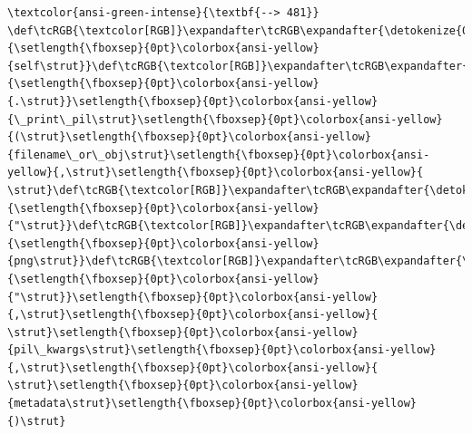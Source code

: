 \documentclass[11pt]{article}
\begin{document}
\begin{Verbatim}[commandchars=\\\{\}, frame=single, framerule=2mm, rulecolor=\color{outerrorbackground}]
\textcolor{ansi-green-intense}{\textbf{--> 481}}     \def\tcRGB{\textcolor[RGB]}\expandafter\tcRGB\expandafter{\detokenize{0,135,0}}{\setlength{\fboxsep}{0pt}\colorbox{ansi-yellow}{self\strut}}\def\tcRGB{\textcolor[RGB]}\expandafter\tcRGB\expandafter{\detokenize{98,98,98}}{\setlength{\fboxsep}{0pt}\colorbox{ansi-yellow}{.\strut}}\setlength{\fboxsep}{0pt}\colorbox{ansi-yellow}{\_print\_pil\strut}\setlength{\fboxsep}{0pt}\colorbox{ansi-yellow}{(\strut}\setlength{\fboxsep}{0pt}\colorbox{ansi-yellow}{filename\_or\_obj\strut}\setlength{\fboxsep}{0pt}\colorbox{ansi-yellow}{,\strut}\setlength{\fboxsep}{0pt}\colorbox{ansi-yellow}{ \strut}\def\tcRGB{\textcolor[RGB]}\expandafter\tcRGB\expandafter{\detokenize{175,0,0}}{\setlength{\fboxsep}{0pt}\colorbox{ansi-yellow}{"\strut}}\def\tcRGB{\textcolor[RGB]}\expandafter\tcRGB\expandafter{\detokenize{175,0,0}}{\setlength{\fboxsep}{0pt}\colorbox{ansi-yellow}{png\strut}}\def\tcRGB{\textcolor[RGB]}\expandafter\tcRGB\expandafter{\detokenize{175,0,0}}{\setlength{\fboxsep}{0pt}\colorbox{ansi-yellow}{"\strut}}\setlength{\fboxsep}{0pt}\colorbox{ansi-yellow}{,\strut}\setlength{\fboxsep}{0pt}\colorbox{ansi-yellow}{ \strut}\setlength{\fboxsep}{0pt}\colorbox{ansi-yellow}{pil\_kwargs\strut}\setlength{\fboxsep}{0pt}\colorbox{ansi-yellow}{,\strut}\setlength{\fboxsep}{0pt}\colorbox{ansi-yellow}{ \strut}\setlength{\fboxsep}{0pt}\colorbox{ansi-yellow}{metadata\strut}\setlength{\fboxsep}{0pt}\colorbox{ansi-yellow}{)\strut}


\end{Verbatim}
\end{document}
